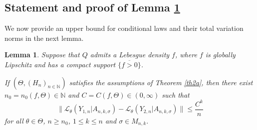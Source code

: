 \documentclass[number,citesort,seceqn,dvips]{arxbj}
\newtheorem{lemma}{Lemma}[section]
\newcommand{\NN}{\mathbb{N}}
\newcommand{\LLL}{{\mathcal L}}
\begin{document}
%

\subsection{\texorpdfstring{Statement and proof of Lemma \protect\ref{condTVlem}}
{Statement and proof of Lemma 5.2}}\label{SUBSEClemma52}
We now provide an upper bound for conditional laws and their total
variation norms in the next lemma.
%
\begin{lemma}\label{condTVlem}
Suppose that $Q$ admits a Lebesgue
density $f$, where
$f$ is globally Lipschitz and has a compact support
$\overline{\{f>0\}}$.

If $(\Theta,(H_n)_{n\in\NN})$ satisfies the assumptions of
Theorem \ref{th2a}, then there exist $n_0=n_0(f,\Theta)\in\NN$ and
$C=C(f,\Theta)\in(0,\infty)$ such that
%
\begin{equation}\label{condTV}
\bigl\|\LLL_\theta (Y_{1,n}
|A_{n,k,\sigma} )-\LLL_\theta (Y_{2,n} |A_{n,k,\sigma} ) \bigr\| \le \frac
{C^k}n
\end{equation}
%
for all $\theta\in\Theta$, $n\ge n_0$, $1 \le
k \le  n$ and $\sigma\in M_{n,k}$.
\end{lemma}
%
\end{document}
